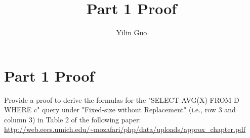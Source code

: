 \documentclass{article}
\author{Yilin Guo}
\title{Part 1 Proof}
\begin{document}
	\maketitle
	\section{Part 1 Proof}
	 Provide a proof to derive the formulas for the "SELECT AVG(X) FROM D WHERE c" query under "Fixed-size without Replacement" (i.e., row 3 and column 3) in Table 2 of the following paper: \url{http://web.eecs.umich.edu/~mozafari/php/data/uploads/approx_chapter.pdf}
	 
	 
	 
	 
\end{document}
